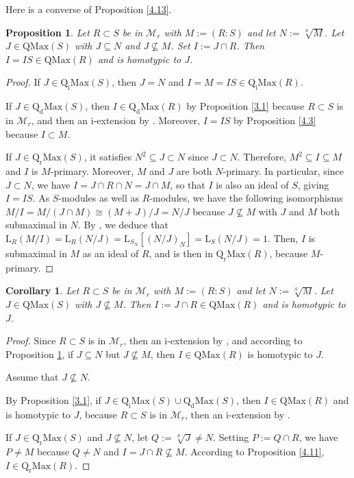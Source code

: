 \documentclass[12pt,leqno]{amsart}
\newtheorem{proposition}[theorem]{Proposition}
\newtheorem{corollary}[theorem]{Corollary}
\theoremstyle{definition}
\begin{document}
Here is a converse of Proposition \ref{4.13}.

\begin{proposition}\label{4.16} Let $R\subset S$ be in $\mathcal M_r$ with $M:=(R:S)$ and let $N:=\sqrt[S]M$. Let $J\in\mathrm{QMax}(S)$ with $J\subseteq N$ and $J\not\subseteq M$. Set $I:=J\cap R$. Then $I=IS\in\mathrm{QMax}(R)$ and is homotypic to $J$.
\end{proposition}

\begin{proof} If $J\in\mathrm{Q_iMax}(S)$, then $J=N$ and $I=M=IS\in\mathrm{Q_iMax}(R)$. 

If $J\in\mathrm{Q_dMax}(S)$, then $I\in\mathrm{Q_dMax}(R)$ by Proposition \ref{3.1} because $R\subset S$ is in $\mathcal M_r$, and then an i-extension by \cite[Theorem 2.2]{SPLIT}. Moreover, $I=IS$ by Proposition \ref{4.3}  because $I\subset M$.

If $J\in\mathrm{Q_rMax}(S)$, it satisfies $N^2\subseteq J\subset N$ since $J\subset N$. Therefore, $M^2\subseteq I\subseteq M$ and $I$ is $M$-primary. Moreover, $M$ and $J$ are both $N$-primary. In particular, since $J\subset N$, we have $I=J\cap R\cap N=J\cap M$, so that $I$ is also an ideal of $S$, giving $I=IS$. As $S$-modules as well as $R$-modules, we have the following isomorphisms $M/I=M/(J\cap M)\cong(M+J)/J=N/J$ because $J\not\subseteq M$ with $J$ and $M$ both submaximal in $N$. By \cite[Theorem 13, p.168]{N}, we deduce that $\mathrm{L}_R(M/I)=\mathrm{L}_R(N/J)=\mathrm{L}_{S_N}[(N/J)_N]=\mathrm{L}_S(N/J)=1$. Then, $I$ is submaximal in $M$ as an ideal of $R$, and is then in $\mathrm{Q_rMax}(R)$, because $M$-primary.  
\end{proof}
 
\begin{corollary}\label{4.19} Let $R\subset S$ be in $\mathcal M_r$ with $ M:=(R:S)$ and let $N:=\sqrt[S]M$. Let $J\in\mathrm{QMax}(S)$ with $J\not\subseteq M$. Then $I:=J\cap R\in\mathrm{QMax}(R)$ and is homotypic to $J$.
\end{corollary}

\begin{proof} Since $R\subset S$ is in $\mathcal M_r$, then an i-extension by \cite[Theorem 2.2]{SPLIT}, and according to Proposition \ref{4.16}, if $J\subseteq N$ but $J\not\subseteq M$, then $I\in\mathrm{QMax}(R)$ is homotypic to $J$.

Assume that $J\not \subseteq N$. 

By Proposition \ref{3.1}, if $J\in\mathrm{Q_iMax}(S)\cup\mathrm{Q_dMax}(S)$, then $I\in\mathrm{QMax}(R)$ and is homotypic to $J$, because $R\subset S$ is in $\mathcal M_r$, then an i-extension by \cite[Theorem 2.2]{SPLIT}. 

If $J\in\mathrm{Q_rMax}(S)$ and $J\not\subseteq N$, let $Q:=\sqrt[S]J\neq N$. Setting $P:=Q\cap R$, we have $P\neq M$ because $Q\neq N$ and $I=J\cap R\not\subseteq M$. According to Proposition \ref{4.11}, $I\in\mathrm{Q_rMax}(R)$. 
\end{proof}
\end{document}
